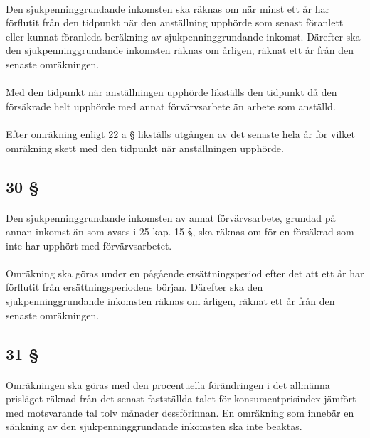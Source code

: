 \documentclass[a4paper,notitlepage,openany,10pt]{book}
\begin{document}
\paragraph*{}
Den sjukpenninggrundande inkomsten ska räknas om när minst ett år har förflutit från den tidpunkt när den anställning upphörde som senast föranlett eller kunnat föranleda beräkning av sjukpenninggrundande inkomst. Därefter ska den sjukpenninggrundande inkomsten räknas om årligen, räknat ett år från den senaste omräkningen.
\paragraph*{}
Med den tidpunkt när anställningen upphörde likställs den tidpunkt då den försäkrade helt upphörde med annat förvärvsarbete än arbete som anställd.
\paragraph*{}
Efter omräkning enligt 22 a § likställs utgången av det senaste hela år för vilket omräkning skett med den tidpunkt när anställningen upphörde.
\subsection*{30 §}
\paragraph*{}
Den sjukpenninggrundande inkomsten av annat förvärvsarbete, grundad på annan inkomst än som avses i 25 kap. 15 §, ska räknas om för en försäkrad som inte har upphört med förvärvsarbetet.
\paragraph*{}
Omräkning ska göras under en pågående ersättningsperiod efter det att ett år har förflutit från ersättningsperiodens början. Därefter ska den sjukpenninggrundande inkomsten räknas om årligen, räknat ett år från den senaste omräkningen.
\subsection*{31 §}
\paragraph*{}
Omräkningen ska göras med den procentuella förändringen i det allmänna prisläget räknad från det senast fastställda talet för konsumentprisindex jämfört med motsvarande tal tolv månader dessförinnan. En omräkning som innebär en sänkning av den sjukpenninggrundande inkomsten ska inte beaktas.
\end{document}
